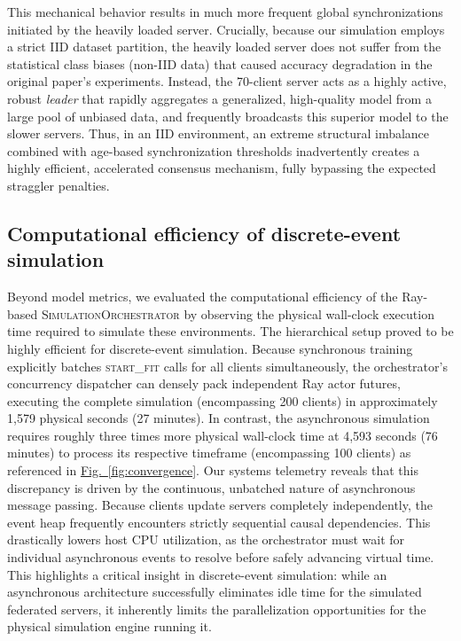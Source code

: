 \documentclass[conference]{IEEEtran}
\newcommand{\figref}[1]{\hyperref[#1]{Fig.~\ref*{#1}}}
\begin{document}
This mechanical behavior results in much more frequent global synchronizations initiated by the heavily loaded server. Crucially, because our simulation employs a strict IID dataset partition, the heavily loaded server does not suffer from the statistical class biases (non-IID data) that caused accuracy degradation in the original paper's experiments. Instead, the 70-client server acts as a highly active, robust \textit{leader} that rapidly aggregates a generalized, high-quality model from a large pool of unbiased data, and frequently broadcasts this superior model to the slower servers. Thus, in an IID environment, an extreme structural imbalance combined with age-based synchronization thresholds inadvertently creates a highly efficient, accelerated consensus mechanism, fully bypassing the expected straggler penalties.

\subsection{Computational efficiency of discrete-event simulation}
Beyond model metrics, we evaluated the computational efficiency of the Ray-based \textsc{SimulationOrchestrator} by observing the physical wall-clock execution time required to simulate these environments. The hierarchical setup proved to be highly efficient for discrete-event simulation. Because synchronous training explicitly batches \textsc{start\_fit} calls for all clients simultaneously, the orchestrator's concurrency dispatcher can densely pack independent Ray actor futures, executing the complete simulation (encompassing 200 clients) in approximately 1,579 physical seconds (27 minutes). In contrast, the asynchronous simulation requires roughly three times more physical wall-clock time at 4,593 seconds (76 minutes) to process its respective timeframe (encompassing 100 clients) as referenced in \figref{fig:convergence}. Our systems telemetry reveals that this discrepancy is driven by the continuous, unbatched nature of asynchronous message passing. Because clients update servers completely independently, the event heap frequently encounters strictly sequential causal dependencies. This drastically lowers host CPU utilization, as the orchestrator must wait for individual asynchronous events to resolve before safely advancing virtual time. This highlights a critical insight in discrete-event simulation: while an asynchronous architecture successfully eliminates idle time for the simulated federated servers, it inherently limits the parallelization opportunities for the physical simulation engine running it.
\end{document}
